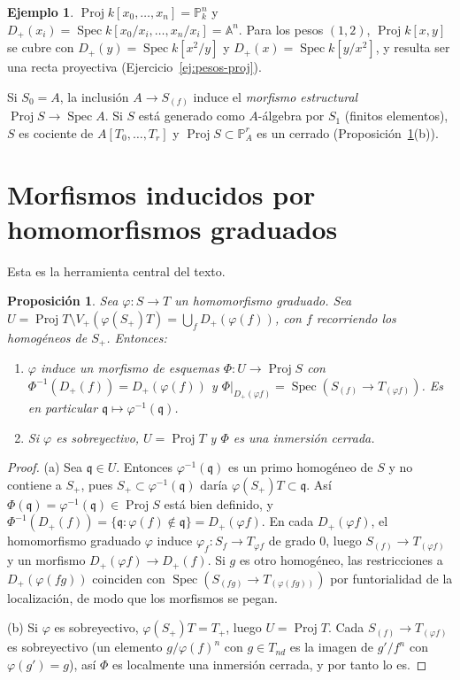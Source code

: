 \documentclass[11pt,a4paper,oneside]{book}
\newcommand{\Spec}{\operatorname{Spec}}
\newcommand{\Proj}{\operatorname{Proj}}
\newcommand{\A}{\mathbb{A}}
\newcommand{\PP}{\mathbb{P}}
\theoremstyle{plain}
\newtheorem{proposicion}[teorema]{Proposición}
\theoremstyle{definition}
\newtheorem{ejemplo}[teorema]{Ejemplo}
\theoremstyle{remark}
\begin{document}
\begin{ejemplo}
$\Proj k[x_0,\dots,x_n]=\PP^n_k$ y $D_+(x_i)=\Spec k[x_0/x_i,\dots,x_n/x_i]=\A^n$. Para los pesos $(1,2)$, $\Proj k[x,y]$ se cubre con $D_+(y)=\Spec k[x^2/y]$ y $D_+(x)=\Spec k[y/x^2]$, y resulta ser una recta proyectiva (Ejercicio~\ref{ej:pesos-proj}).
\end{ejemplo}

Si $S_0=A$, la inclusión $A\to S_{(f)}$ induce el \emph{morfismo estructural} $\Proj S\to\Spec A$. Si $S$ está generado como $A$-álgebra por $S_1$ (finitos elementos), $S$ es cociente de $A[T_0,\dots,T_r]$ y $\Proj S\subset\PP^r_A$ es un cerrado (Proposición~\ref{prop:homo-morf}(b)).

\section{Morfismos inducidos por homomorfismos graduados}

Esta es la herramienta central del texto.

\begin{proposicion}\label{prop:homo-morf}
Sea $\varphi:S\to T$ un homomorfismo graduado. Sea $U=\Proj T\setminus V_+(\varphi(S_+)T)=\bigcup_{f}D_+(\varphi(f))$, con $f$ recorriendo los homogéneos de $S_+$. Entonces:
\begin{enumerate}[label=(\alph*)]
\item $\varphi$ induce un morfismo de esquemas $\Phi:U\to\Proj S$ con $\Phi^{-1}(D_+(f))=D_+(\varphi(f))$ y $\Phi|_{D_+(\varphi f)}=\Spec(S_{(f)}\to T_{(\varphi f)})$. Es en particular $\mathfrak q\mapsto\varphi^{-1}(\mathfrak q)$.
\item Si $\varphi$ es sobreyectivo, $U=\Proj T$ y $\Phi$ es una inmersión cerrada.
\end{enumerate}
\end{proposicion}

\begin{proof}
(a) Sea $\mathfrak q\in U$. Entonces $\varphi^{-1}(\mathfrak q)$ es un primo homogéneo de $S$ y no contiene a $S_+$, pues $S_+\subset\varphi^{-1}(\mathfrak q)$ daría $\varphi(S_+)T\subset\mathfrak q$. Así $\Phi(\mathfrak q)=\varphi^{-1}(\mathfrak q)\in\Proj S$ está bien definido, y $\Phi^{-1}(D_+(f))=\{\mathfrak q:\varphi(f)\notin\mathfrak q\}=D_+(\varphi f)$. En cada $D_+(\varphi f)$, el homomorfismo graduado $\varphi$ induce $\varphi_f:S_f\to T_{\varphi f}$ de grado $0$, luego $S_{(f)}\to T_{(\varphi f)}$ y un morfismo $D_+(\varphi f)\to D_+(f)$. Si $g$ es otro homogéneo, las restricciones a $D_+(\varphi(fg))$ coinciden con $\Spec(S_{(fg)}\to T_{(\varphi(fg))})$ por funtorialidad de la localización, de modo que los morfismos se pegan.

(b) Si $\varphi$ es sobreyectivo, $\varphi(S_+)T=T_+$, luego $U=\Proj T$. Cada $S_{(f)}\to T_{(\varphi f)}$ es sobreyectivo (un elemento $g/\varphi(f)^n$ con $g\in T_{nd}$ es la imagen de $g'/f^n$ con $\varphi(g')=g$), así $\Phi$ es localmente una inmersión cerrada, y por tanto lo es.
\end{proof}
\end{document}
